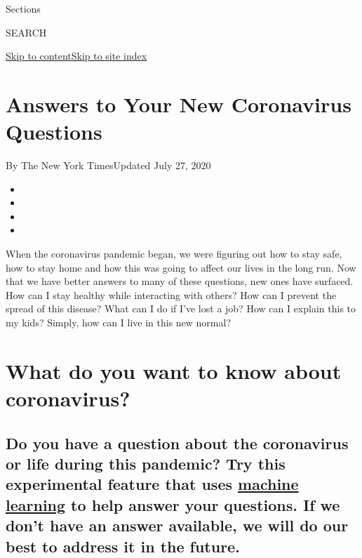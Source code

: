 Sections

SEARCH

\protect\hyperlink{site-content}{Skip to
content}\protect\hyperlink{site-index}{Skip to site index}

\hypertarget{answers-to-your-new-coronavirus-questions}{%
\section{Answers to Your New Coronavirus
Questions}\label{answers-to-your-new-coronavirus-questions}}

By The New York TimesUpdated July 27, 2020

\begin{itemize}
\item
\item
\item
\item
\end{itemize}

When the coronavirus pandemic began, we were figuring out how to stay
safe, how to stay home and how this was going to affect our lives in the
long run. Now that we have better answers to many of these questions,
new ones have surfaced. How can I stay healthy while interacting with
others? How can I prevent the spread of this disease? What can I do if
I've lost a job? How can I explain this to my kids? Simply, how can I
live in this new normal?

\hypertarget{what-do-you-want-to-know-about-coronavirus}{%
\section{What do you want to know about
coronavirus?}\label{what-do-you-want-to-know-about-coronavirus}}

\hypertarget{do-you-have-a-question-about-the-coronavirus-or-life-during-this-pandemic-try-this-experimental-feature-that-uses-machine-learning-to-help-answer-your-questions-if-we-dont-have-an-answer-available-we-will-do-our-best-to-address-it-in-the-future}{%
\subsection{\texorpdfstring{Do you have a question about the coronavirus
or life during this pandemic? Try this experimental feature that uses
\href{https://www.nytimes.com/2018/11/18/technology/artificial-intelligence-language.html?searchResultPosition=4}{machine
learning} to help answer your questions. If we don't have an answer
available, we will do our best to address it in the
future.}{Do you have a question about the coronavirus or life during this pandemic? Try this experimental feature that uses machine learning to help answer your questions. If we don't have an answer available, we will do our best to address it in the future.}}\label{do-you-have-a-question-about-the-coronavirus-or-life-during-this-pandemic-try-this-experimental-feature-that-uses-machine-learning-to-help-answer-your-questions-if-we-dont-have-an-answer-available-we-will-do-our-best-to-address-it-in-the-future}}

